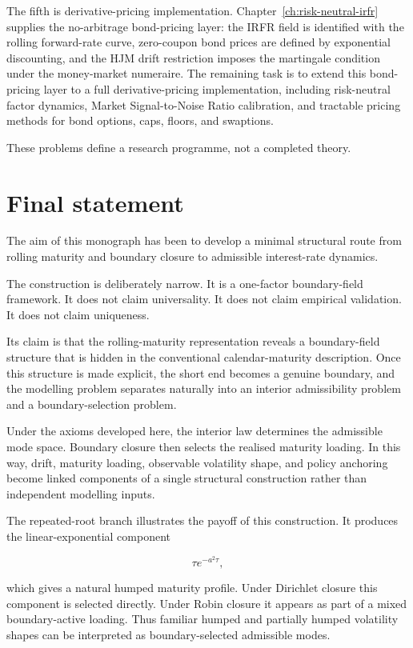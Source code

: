 \documentclass[11pt,oneside]{book}
\begin{document}
The fifth is derivative-pricing implementation. Chapter~\ref{ch:risk-neutral-irfr}
supplies the no-arbitrage bond-pricing layer: the IRFR field is identified
with the rolling forward-rate curve, zero-coupon bond prices are defined
by exponential discounting, and the HJM drift restriction imposes the
martingale condition under the money-market numeraire. The remaining task
is to extend this bond-pricing layer to a full derivative-pricing
implementation, including risk-neutral factor dynamics, Market
Signal-to-Noise Ratio calibration, and tractable pricing methods for bond
options, caps, floors, and swaptions.

These problems define a research programme, not a completed theory.

\section{Final statement}\label{final-statement}

The aim of this monograph has been to develop a minimal structural route
from rolling maturity and boundary closure to admissible interest-rate
dynamics.

The construction is deliberately narrow. It is a one-factor
boundary-field framework. It does not claim universality. It does not
claim empirical validation. It does not claim uniqueness.

Its claim is that the rolling-maturity representation reveals a
boundary-field structure that is hidden in the conventional
calendar-maturity description. Once this structure is made explicit, the
short end becomes a genuine boundary, and the modelling problem
separates naturally into an interior admissibility problem and a
boundary-selection problem.

Under the axioms developed here, the interior law determines the
admissible mode space. Boundary closure then selects the realised
maturity loading. In this way, drift, maturity loading, observable
volatility shape, and policy anchoring become linked components of a
single structural construction rather than independent modelling inputs.

The repeated-root branch illustrates the payoff of this construction. It
produces the linear-exponential component

\[
\tau e^{-a^2\tau},
\]

which gives a natural humped maturity profile. Under Dirichlet closure
this component is selected directly. Under Robin closure it appears as
part of a mixed boundary-active loading. Thus familiar humped and
partially humped volatility shapes can be interpreted as
boundary-selected admissible modes.
\end{document}
